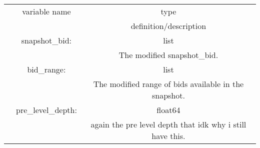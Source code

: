 \begin{tabular}{ c c c }
	 & variable name & type\\
	 && definition/description\\
	 & snapshot\_bid: & list\\
	 & & The modified snapshot\_bid.\\
	 & bid\_range: & list \\
	 && The modified range of bids available in the snapshot.\\
	 &pre\_level\_depth: &float64\\
	 && again the pre level depth that idk why i still have this.\\
\end{tabular}